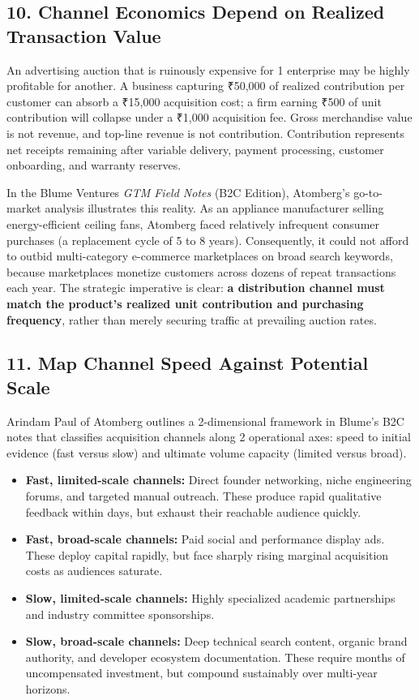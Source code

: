 \subsection*{10. Channel Economics Depend on Realized Transaction Value}

An advertising auction that is ruinously expensive for 1 enterprise may be highly profitable for another. A business capturing ₹50,000 of realized contribution per customer can absorb a ₹15,000 acquisition cost; a firm earning ₹500 of unit contribution will collapse under a ₹1,000 acquisition fee. Gross merchandise value is not revenue, and top-line revenue is not contribution. Contribution represents net receipts remaining after variable delivery, payment processing, customer onboarding, and warranty reserves.

In the Blume Ventures \textit{GTM Field Notes} (B2C Edition), Atomberg's go-to-market analysis illustrates this reality. As an appliance manufacturer selling energy-efficient ceiling fans, Atomberg faced relatively infrequent consumer purchases (a replacement cycle of 5 to 8 years). Consequently, it could not afford to outbid multi-category e-commerce marketplaces on broad search keywords, because marketplaces monetize customers across dozens of repeat transactions each year. The strategic imperative is clear: \textbf{a distribution channel must match the product's realized unit contribution and purchasing frequency}, rather than merely securing traffic at prevailing auction rates.

\subsection*{11. Map Channel Speed Against Potential Scale}

Arindam Paul of Atomberg outlines a 2-dimensional framework in Blume's B2C notes that classifies acquisition channels along 2 operational axes: speed to initial evidence (fast versus slow) and ultimate volume capacity (limited versus broad).
\begin{itemize}[leftmargin=*,itemsep=1pt]
  \item \textbf{Fast, limited-scale channels:} Direct founder networking, niche engineering forums, and targeted manual outreach. These produce rapid qualitative feedback within days, but exhaust their reachable audience quickly.
  \item \textbf{Fast, broad-scale channels:} Paid social and performance display ads. These deploy capital rapidly, but face sharply rising marginal acquisition costs as audiences saturate.
  \item \textbf{Slow, limited-scale channels:} Highly specialized academic partnerships and industry committee sponsorships.
  \item \textbf{Slow, broad-scale channels:} Deep technical search content, organic brand authority, and developer ecosystem documentation. These require months of uncompensated investment, but compound sustainably over multi-year horizons.
\end{itemize}

